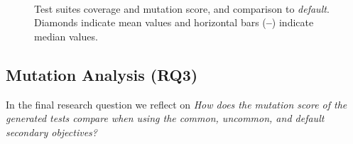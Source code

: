 \begin{figure}[t]
    \centering
    \hfill
    \\ 
   
    \caption{Test suites coverage and mutation score, and comparison to \textit{default}. Diamonds indicate mean values and horizontal bars (\textbf{--}) indicate median values.}
    \label{fig:rq2}
\end{figure}

\subsection{Mutation Analysis (RQ3)}

In the final research question we reflect on \emph{How does the \emph{mutation score} of the generated tests  compare when using the \textit{common}, \textit{uncommon}, and \textit{default} secondary objectives? }

